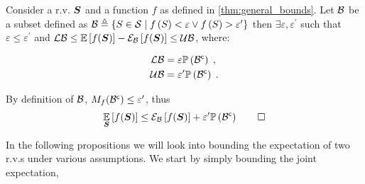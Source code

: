 \begin{propositionE}
	\label{thm:bound_epsilon}
	Consider a r.v. $\boldsymbol S$ and a function $f$ as defined in \cref{thm:general_bounds}. Let $\mathcal B$ be a subset defined as $\mathcal B\triangleq\{S\in\mathcal S \mid f\left(S\right) < \varepsilon\lor f\left(S\right) > \varepsilon^\prime\}$ then $\exists\varepsilon,\varepsilon^\prime$ such that $\varepsilon\leq\varepsilon^\prime$ and $\operatorname*{\mathcal{LB}}\leq\operatorname*{\mathbb{E}}\limits_{}\left[{f(\boldsymbol S)}\right]-\mathcal{E}_{\mathcal B}\left[{f(\boldsymbol S)}\right]\leq\operatorname*{\mathcal{UB}}$, where:
	\begin{subequations}
		\begin{align}
			\operatorname*{\mathcal{LB}} & =\varepsilon\mathbb{P}\left({{\mathcal B}^{\mathsf{c}}}\right)\;,
			\\
			\operatorname*{\mathcal{UB}} & =\varepsilon^\prime\mathbb{P}\left({{\mathcal B}^{\mathsf{c}}}\right)\;.
		\end{align}
	\end{subequations}
\end{propositionE}
\begin{proofE}
	By definition of $\mathcal B$, $M_f({\mathcal B}^{\mathsf{c}})\leq\varepsilon^\prime$,  thus
	\begin{equation*}
		\operatorname*{\mathbb{E}}\limits_{\boldsymbol S}\left[{f(\boldsymbol S)}\right]\leq\mathcal{E}_{\mathcal B}\left[{f(\boldsymbol S)}\right] +\varepsilon^\prime\mathbb{P}\left({{\mathcal B}^{\mathsf{c}}}\right)\qed
	\end{equation*}
\end{proofE}

In the following propositions we will look into bounding the expectation of two r.v.s under various assumptions. We start by simply bounding the joint expectation,

